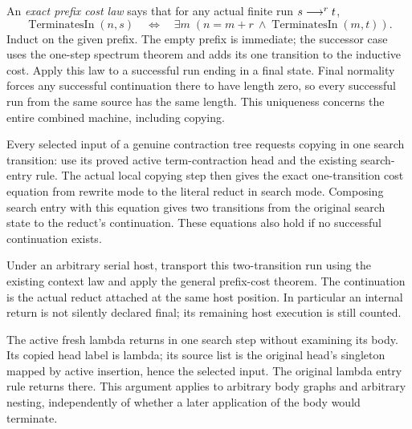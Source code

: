 An \emph{exact prefix cost law} says that for any actual finite run
$s\mathrel{\longrightarrow^{r}}t$,
\[
 \operatorname{TerminatesIn}(n,s)
 \quad\Longleftrightarrow\quad
 \exists m\;(n=m+r\ \wedge\operatorname{TerminatesIn}(m,t)).
\]
Induct on the given prefix. The empty prefix is immediate; the successor
case uses the one-step spectrum theorem and adds its one transition to the
inductive cost. Apply this law to a successful run ending in a final state.
Final normality forces any successful continuation there to have length zero,
so every successful run from the same source has the same length. This
uniqueness concerns the entire combined machine, including copying.



Every selected input of a genuine contraction tree requests copying in one
search transition: use its proved active term-contraction head and the existing
search-entry rule. The actual local copying step then gives the exact
one-transition cost equation from rewrite mode to the literal reduct in
search mode. Composing search entry with this equation gives two transitions
from the original search state to the reduct's continuation. These equations
also hold if no successful continuation exists.




Under an arbitrary serial host, transport this two-transition run using the
existing context law and apply the general prefix-cost theorem. The continuation
is the actual reduct attached at the same host position. In particular an
internal return is not silently declared final; its remaining host execution
is still counted.


The active fresh lambda returns in one search step without examining its
body. Its copied head label is lambda; its source list is the original head's
singleton mapped by active insertion, hence the selected input. The original
lambda entry rule returns there. This argument applies to arbitrary body
graphs and arbitrary nesting, independently of whether a later application
of the body would terminate.


